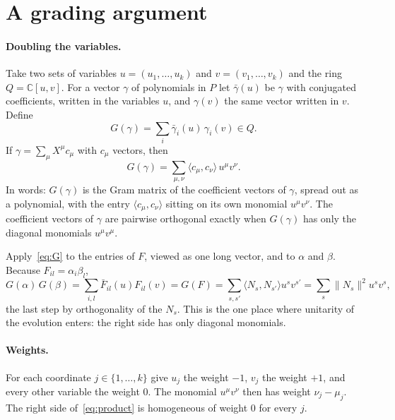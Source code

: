 \documentclass[11pt]{article}
\theoremstyle{remark}
\newcommand{\C}{\mathbb{C}}
\newcommand{\ip}[2]{\langle #1,#2\rangle}
\begin{document}
\section{A grading argument}\label{sec:grading}

\paragraph{Doubling the variables.} Take two sets of variables $u=(u_1,\dots,u_k)$ and
$v=(v_1,\dots,v_k)$ and the ring $Q=\C[u,v]$. For a vector $\gamma$ of polynomials in $P$ let
$\bar\gamma(u)$ be $\gamma$ with conjugated coefficients, written in the variables $u$, and
$\gamma(v)$ the same vector written in $v$. Define
\[
G(\gamma)=\sum_i\bar\gamma_i(u)\,\gamma_i(v)\in Q .
\]
If $\gamma=\sum_\mu X^\mu c_\mu$ with $c_\mu$ vectors, then
\begin{equation}\label{eq:G}
G(\gamma)=\sum_{\mu,\nu}\ip{c_\mu}{c_\nu}\,u^\mu v^\nu .
\end{equation}
In words: $G(\gamma)$ is the Gram matrix of the coefficient vectors of $\gamma$, spread out as
a polynomial, with the entry $\ip{c_\mu}{c_\nu}$ sitting on its own monomial $u^\mu v^\nu$.
The coefficient vectors of $\gamma$ are pairwise orthogonal exactly when $G(\gamma)$ has only
the diagonal monomials $u^\mu v^\mu$.

Apply~\eqref{eq:G} to the entries of $F$, viewed as one long vector, and to $\alpha$ and
$\beta$. Because $F_{il}=\alpha_i\beta_l$,
\begin{equation}\label{eq:product}
G(\alpha)\,G(\beta)=\sum_{i,l}\bar F_{il}(u)F_{il}(v)=G(F)=\sum_{s,s'}\ip{N_s}{N_{s'}}u^sv^{s'}
=\sum_s\lVert N_s\rVert^2u^sv^s ,
\end{equation}
the last step by orthogonality of the $N_s$. This is the one place where unitarity of the
evolution enters: the right side has only diagonal monomials.

\paragraph{Weights.} For each coordinate $j\in\{1,\dots,k\}$ give $u_j$ the weight $-1$,
$v_j$ the weight $+1$, and every other variable the weight $0$. The monomial $u^\mu v^\nu$
then has weight $\nu_j-\mu_j$. The right side of~\eqref{eq:product} is homogeneous of weight
$0$ for every $j$.
\end{document}

